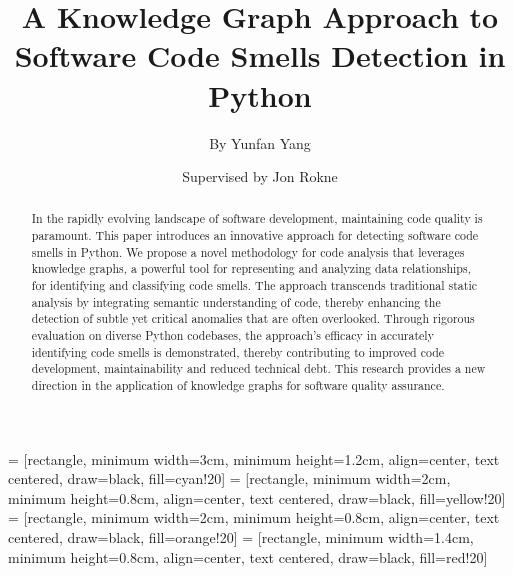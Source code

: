 \documentclass[sigconf]{acmart}
\begin{document}
\title{A Knowledge Graph Approach to Software Code Smells Detection in Python}

\author{By Yunfan Yang}
\author{Supervised by Jon Rokne}




\begin{abstract}
In the rapidly evolving landscape of software development, maintaining code quality is paramount. This paper introduces an innovative approach for detecting software code smells in Python. We propose a novel methodology for code analysis that leverages knowledge graphs, a powerful tool for representing and analyzing data relationships, for identifying and classifying code smells. The approach transcends traditional static analysis by integrating semantic understanding of code, thereby enhancing the detection of subtle yet critical anomalies that are often overlooked. Through rigorous evaluation on diverse Python codebases, the approach's efficacy in accurately identifying code smells is demonstrated, thereby contributing to improved code development, maintainability and reduced technical debt. This research provides a new direction in the application of knowledge graphs for software quality assurance.
\end{abstract}

\maketitle


 = [rectangle, minimum width=3cm, minimum height=1.2cm, align=center, text centered, draw=black, fill=cyan!20]
 = [rectangle, minimum width=2cm, minimum height=0.8cm, align=center, text centered, draw=black, fill=yellow!20]
 = [rectangle, minimum width=2cm, minimum height=0.8cm, align=center, text centered, draw=black, fill=orange!20]
 = [rectangle, minimum width=1.4cm, minimum height=0.8cm, align=center, text centered, draw=black, fill=red!20]
\end{document}
